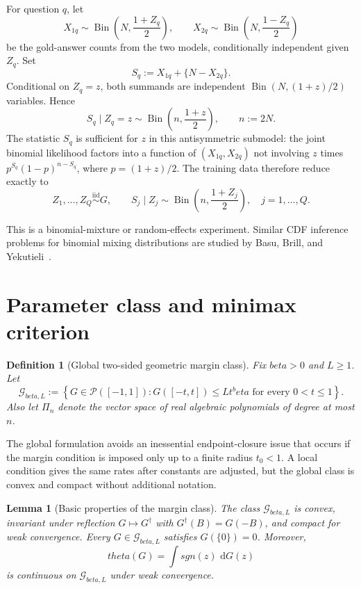 \documentclass[11pt]{article}
\def\beta{beta}%
\def\theta{theta}%
\def\sgn{sgn}%
\newtheorem{lemma}[theorem]{Lemma}
\newtheorem{definition}[theorem]{Definition}
\newcommand{\sgn}{\operatorname{sgn}}
\newcommand{\Bin}{\operatorname{Bin}}
\newcommand{\calG}{\mathcal G}
\newcommand{\calP}{\mathcal P}
\newcommand{\dd}{\,\mathrm d}
\begin{document}
For question $q$, let
\[
X_{1q}\sim\Bin\left(N,\frac{1+Z_q}{2}\right),
\qquad
X_{2q}\sim\Bin\left(N,\frac{1-Z_q}{2}\right)
\]
be the gold-answer counts from the two models, conditionally independent given $Z_q$.  Set
\[
S_q:=X_{1q}+\{N-X_{2q}\}.
\]
Conditional on $Z_q=z$, both summands are independent $\Bin(N,(1+z)/2)$ variables.  Hence
\begin{equation}
\label{eq:binomial-reduction}
S_q\mid Z_q=z
\sim
\Bin\left(n,\frac{1+z}{2}\right),
\qquad n:=2N.
\end{equation}
The statistic $S_q$ is sufficient for $z$ in this antisymmetric submodel: the joint binomial likelihood factors into a function of $(X_{1q},X_{2q})$ not involving $z$ times $p^{S_q}(1-p)^{n-S_q}$, where $p=(1+z)/2$.  The training data therefore reduce exactly to
\begin{equation}
\label{eq:mixture-experiment}
Z_1,\dots,Z_Q\overset{\mathrm{iid}}{\sim}G,
\qquad
S_j\mid Z_j\sim\Bin\left(n,\frac{1+Z_j}{2}\right),
\quad j=1,\dots,Q.
\end{equation}

This is a binomial-mixture or random-effects experiment.  Similar CDF inference problems for binomial mixing distributions are studied by Basu, Brill, and Yekutieli~\cite{BasuBrillYekutieli}.

\section{Parameter class and minimax criterion}

\begin{definition}[Global two-sided geometric margin class]
\label{def:margin-class}
Fix $\beta>0$ and $L\ge1$.  Let
\begin{equation}
\label{eq:margin-class}
\calG_{\beta,L}
:=
\left\{
G\in\calP([-1,1]):
G([-t,t])\le L t^\beta
\text{ for every }0<t\le1
\right\}.
\end{equation}
Also let $\Pi_n$ denote the vector space of real algebraic polynomials of degree at most $n$.
\end{definition}

The global formulation avoids an inessential endpoint-closure issue that occurs if the margin condition is imposed only up to a finite radius $t_0<1$.  A local condition gives the same rates after constants are adjusted, but the global class is convex and compact without additional notation.

\begin{lemma}[Basic properties of the margin class]
\label{lem:margin-class-properties}
The class $\calG_{\beta,L}$ is convex, invariant under reflection $G\mapsto G^\dagger$ with $G^\dagger(B)=G(-B)$, and compact for weak convergence.  Every $G\in\calG_{\beta,L}$ satisfies $G(\{0\})=0$.  Moreover,
\[
\theta(G)=\int\sgn(z)\,\dd G(z)
\]
is continuous on $\calG_{\beta,L}$ under weak convergence.
\end{lemma}
\end{document}
